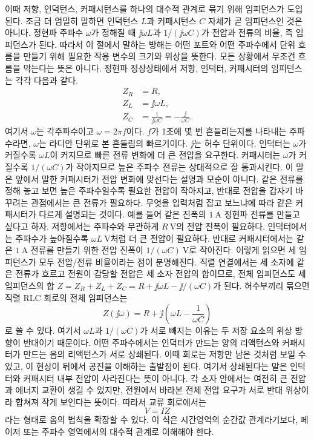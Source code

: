 이때 저항, 인덕턴스, 커패시턴스를 하나의 대수적 관계로 묶기 위해 임피던스가 도입된다.
조금 더 엄밀히 말하면 인덕턴스 $L$과 커패시턴스 $C$ 자체가 곧 임피던스인 것은 아니다.
정현파 주파수 $\omega$가 정해질 때 $\jj\omega L$과 $1/(\jj\omega C)$가 전압과 전류의 비율, 즉 임피던스가 된다.
따라서 이 절에서 말하는 방해는 어떤 포트와 어떤 주파수에서 단위 흐름을 만들기 위해 필요한 작용 변수의 크기와 위상을 뜻한다.
모든 상황에서 무조건 흐름을 막는다는 뜻은 아니다.
정현파 정상상태에서 저항, 인덕터, 커패시터의 임피던스는 각각 다음과 같다.
\begin{align}
  Z_R &= R, \\
  Z_L &= \jj \omega L, \\
  Z_C &= \frac{1}{\jj \omega C}=-\frac{\jj}{\omega C}.
\end{align}
여기서 $\omega$는 각주파수이고 $\omega=2\pi f$이다.
$f$가 1초에 몇 번 흔들리는지를 나타내는 주파수라면, $\omega$는 라디안 단위로 본 흔들림의 빠르기이다.
$\jj$는 허수 단위이다.
인덕터는 $\omega$가 커질수록 $\omega L$이 커지므로 빠른 전류 변화에 더 큰 전압을 요구한다.
커패시터는 $\omega$가 커질수록 $1/(\omega C)$가 작아지므로 높은 주파수 전류는 상대적으로 잘 통과시킨다.
이 말은 앞에서 말한 커패시터가 전압 변화에 맞선다는 설명과 모순이 아니다.
같은 전류를 정해 놓고 보면 높은 주파수일수록 필요한 전압이 작아지고, 반대로 전압을 갑자기 바꾸려는 관점에서는 큰 전류가 필요하다.
무엇을 입력처럼 잡고 보느냐에 따라 같은 커패시터가 다르게 설명되는 것이다.
예를 들어 같은 진폭의 $1~\mathrm{A}$ 정현파 전류를 만들고 싶다고 하자.
저항에서는 주파수와 무관하게 $R~\mathrm{V}$의 전압 진폭이 필요하다.
인덕터에서는 주파수가 높아질수록 $\omega L~\mathrm{V}$처럼 더 큰 전압이 필요하다.
반대로 커패시터에서는 같은 $1~\mathrm{A}$ 전류를 만들기 위한 전압 진폭이 $1/(\omega C)~\mathrm{V}$로 작아진다.
이렇게 읽으면 세 임피던스가 모두 전압/전류 비율이라는 점이 분명해진다.
직렬 연결에서는 세 소자에 같은 전류가 흐르고 전원이 감당할 전압은 세 소자 전압의 합이므로, 전체 임피던스도 세 임피던스의 합 $Z=Z_R+Z_L+Z_C=R+\jj\omega L-\jj/(\omega C)$가 된다.
%
허수부끼리 묶으면 직렬 RLC 회로의 전체 임피던스는
\begin{equation}
  Z(\jj\omega) = R + \jj \left( \omega L - \frac{1}{\omega C} \right)
\end{equation}
로 쓸 수 있다.
여기서 $\omega L$과 $1/(\omega C)$가 서로 빼지는 이유는 두 저장 요소의 위상 방향이 반대이기 때문이다.
어떤 주파수에서는 인덕터가 만드는 양의 리액턴스와 커패시터가 만드는 음의 리액턴스가 서로 상쇄된다.
이때 회로는 저항만 남은 것처럼 보일 수 있고, 이 현상이 뒤에서 공진을 이해하는 출발점이 된다.
여기서 상쇄된다는 말은 인덕터와 커패시터 내부 전압이 사라진다는 뜻이 아니다.
각 소자 안에서는 여전히 큰 전압과 에너지 교환이 생길 수 있지만, 전원에서 바라본 전체 전압 요구가 서로 반대 위상이라 합쳐져 작게 보인다는 뜻이다.
따라서 교류 회로에서는
\begin{equation}
  V = I Z
\end{equation}
라는 형태로 옴의 법칙을 확장할 수 있다.
이 식은 시간영역의 순간값 관계라기보다, 페이저 또는 주파수 영역에서의 대수적 관계로 이해해야 한다.

